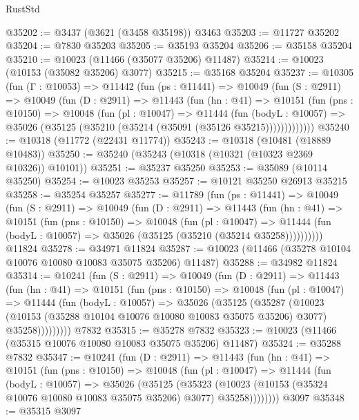 \begin{lexlean}{RustStd}
\begin{coremodule}
@35202 := @3437 (@3621 (@3458 @35198)) @3463
@35203 := @11727 @35202
@35204 := @7830 @35203
@35205 := @35193 @35204
@35206 := @35158 @35204
@35210 := @10023 (@11466 (@35077 @35206) @11487)
@35214 := @10023 (@10153 (@35082 @35206) @3077)
@35215 := @35168 @35204
@35237 := @10305
    (fun (Γ : @10053) =>
    @11442
      (fun (ps : @11441) =>
      @10049
        (fun (S : @2911) =>
        @10049
          (fun (D : @2911) =>
          @11443
            (fun (hn : @41) =>
            @10151
              (fun (pns : @10150) =>
              @10048
                (fun (pl : @10047) =>
                @11444
                  (fun (bodyL : @10057) =>
                  @35026 (@35125 (@35210 (@35214 (@35091 (@35126 @35215)))))))))))))
@35240 := @10318 (@11772 (@22431 @11774))
@35243 := @10318 (@10481 (@18889 @10483))
@35250 := @35240 (@35243 (@10318 (@10321 (@10323 @2369 @10326)) @10101))
@35251 := @35237 @35250
@35253 := @35089 (@10114 @35250)
@35254 := @10023 @35253
@35257 := @10121 @35250 @26913 @35215
@35258 := @35254 @35257
@35277 := @11789
    (fun (ps : @11441) =>
    @10049
      (fun (S : @2911) =>
      @10049
        (fun (D : @2911) =>
        @11443
          (fun (hn : @41) =>
          @10151
            (fun (pns : @10150) =>
            @10048
              (fun (pl : @10047) =>
              @11444 (fun (bodyL : @10057) => @35026 (@35125 (@35210 (@35214 @35258))))))))))
    @11824
@35278 := @34971 @11824
@35287 := @10023 (@11466 (@35278 @10104 @10076 @10080 @10083 @35075 @35206) @11487)
@35288 := @34982 @11824
@35314 := @10241
    (fun (S : @2911) =>
    @10049
      (fun (D : @2911) =>
      @11443
        (fun (hn : @41) =>
        @10151
          (fun (pns : @10150) =>
          @10048
            (fun (pl : @10047) =>
            @11444
              (fun (bodyL : @10057) =>
              @35026
                (@35125
                  (@35287
                    (@10023
                      (@10153 (@35288 @10104 @10076 @10080 @10083 @35075 @35206) @3077)
                      @35258)))))))))
    @7832
@35315 := @35278 @7832
@35323 := @10023 (@11466 (@35315 @10076 @10080 @10083 @35075 @35206) @11487)
@35324 := @35288 @7832
@35347 := @10241
    (fun (D : @2911) =>
    @11443
      (fun (hn : @41) =>
      @10151
        (fun (pns : @10150) =>
        @10048
          (fun (pl : @10047) =>
          @11444
            (fun (bodyL : @10057) =>
            @35026
              (@35125
                (@35323
                  (@10023 (@10153 (@35324 @10076 @10080 @10083 @35075 @35206) @3077) @35258))))))))
    @3097
@35348 := @35315 @3097

\end{coremodule}
\end{lexlean}
